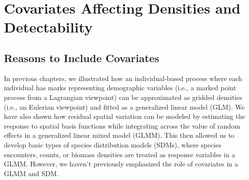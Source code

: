 \chapter{Covariates Affecting Densities and Detectability}\label{Chap7}

\section{Reasons to Include Covariates} \label{sec:Chap7}

In previous chapters, we illustrated how an individual-based process where each individual has marks representing demographic variables (i.e., a marked point process from a Lagrangian viewpoint) can be approximated as gridded densities (i.e., an Eulerian viewpoint) and fitted as a generalized linear model (GLM).  We have also shown how residual spatial variation can be modeled by estimating the response to spatial basis functions while integrating across the value of random effects in a generalized linear mixed model (GLMM).  This then allowed us to develop basic types of species distribution models (SDMs), where species encounters, counts, or biomass densities are treated as response variables in a GLMM.  However, we haven't previously emphasized the role of covariates in a GLMM and SDM.

